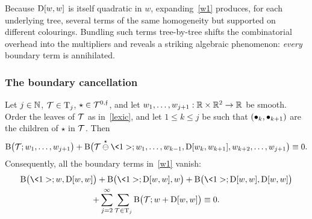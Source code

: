 Because $\mathrm{D}[w,w]$ is itself quadratic in $w$, expanding~\eqref{w1} produces, for each underlying tree, several terms of the same homogeneity but supported on different colourings. Bundling such terms tree-by-tree shifts the combinatorial overhead into the multipliers and reveals a striking algebraic phenomenon: \emph{every} boundary term is annihilated.

\subsubsection*{The boundary cancellation}

\begin{lemma}
\label{LEM:wbd}
Let $j\in\mathbb{N}$, $\mathcal{T}\in \mathrm{T}_j$, $\star \in \mathcal{T}^{0,\mathfrak{f}}$, and let $w_1, \ldots, w_{j+1}: \mathbb{R}\times \mathbb{R}^2 \to \mathbb{R}$ be smooth. Order the leaves of $\mathcal{T}$ as in~\eqref{lexic}, and let $1 \le k \le j$ be such that $(\bullet_k, \bullet_{k+1})$ are the children of $\star$ in $\mathcal{T}$. Then
\begin{align}
\label{wbd0}
\BB\big(\TT ; w_1, \ldots, w_{j+1} \big)
+ \BB\big(\TT\overset{\star}{\ominus} \<1>; w_1,  \ldots, w_{k-1} , \D[w_k,w_{k+1}] , w_{k+2}, \ldots,  w_{j+1} \big) \equiv 0.
\end{align}
Consequently, all the boundary terms in~\eqref{w1} vanish:
\begin{multline}
\label{wbd1}
  \BB \big(\<1>; w, \D[w, w] \big)
+ \BB\big(\<1>; \D[w, w],w\big)
+ \BB\big(\<1>;\D[w, w], \D[w, w]\big)
\\
+ \sum_{j=2}^\infty \sum_{\TT\in \Tr_j}  \BB\big(\TT; w + \D[w, w]\big)  \equiv 0  .
\end{multline}
\end{lemma}

